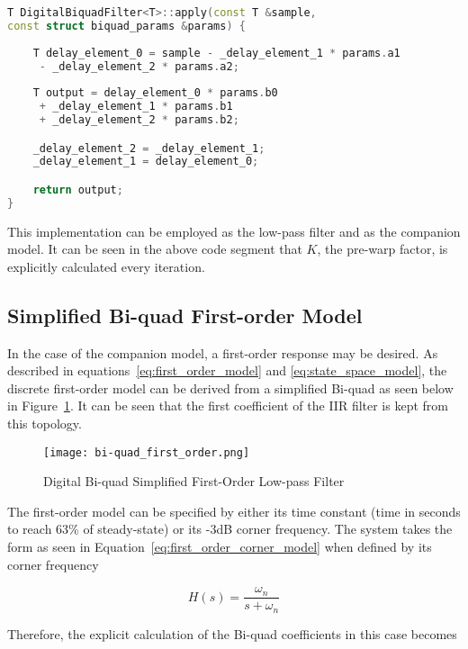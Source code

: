 \begin{lstlisting}[language=c++]
T DigitalBiquadFilter<T>::apply(const T &sample, 
const struct biquad_params &params) {
    
    T delay_element_0 = sample - _delay_element_1 * params.a1 
     - _delay_element_2 * params.a2;
    
    T output = delay_element_0 * params.b0 
     + _delay_element_1 * params.b1 
     + _delay_element_2 * params.b2;

    _delay_element_2 = _delay_element_1;
    _delay_element_1 = delay_element_0;

    return output;
}

\end{lstlisting}

This implementation can be employed as the \Lone low-pass filter and as the companion model.  It can be seen in the above code segment that $K$, the pre-warp factor, is explicitly calculated every iteration.

\subsection{Simplified Bi-quad First-order Model}

In the case of the companion model, a first-order response may be desired.  As described in equations~\ref{eq:first_order_model} and \ref{eq:state_space_model}, the discrete first-order model can be derived from a simplified Bi-quad as seen below in Figure~\ref{fig:bi-quad_first_order}.  It can be seen that the first coefficient of the \ac{IIR} filter is kept from this topology.
\begin{figure}[h!]
 \centering
  \texttt{[image: bi-quad\_first\_order.png]}
  \caption{Digital Bi-quad Simplified First-Order Low-pass Filter }
  \label{fig:bi-quad_first_order}
\end{figure}

The first-order model can be specified by either its time constant (time in seconds to reach 63\% of steady-state) or its -3dB corner frequency.  The system takes the form as seen in Equation~\ref{eq:first_order_corner_model} when defined by its corner frequency

\begin{equation}\label{eq:first_order_corner_model}
H(s)=\frac{\omega_n}{s+\omega_n}
\end{equation}

Therefore, the explicit calculation of the Bi-quad coefficients in this case becomes

